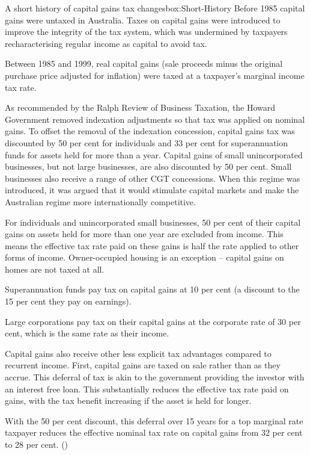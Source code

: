 \documentclass{grattan}\usepackage[]{graphicx}\usepackage[]{color}
\begin{document}
\begin{smallbox}[!htb]{A short history of capital gains tax changes}{box:Short-History}
Before 1985 capital gains were untaxed in Australia. Taxes on capital gains were introduced to improve the integrity of the tax system, which was undermined by taxpayers recharacterising regular income as capital to avoid tax.   

Between 1985 and 1999, real capital gains (sale proceeds minus the original purchase price adjusted for inflation) were taxed at a taxpayer's marginal income tax rate. 

As recommended by the Ralph Review of Business Taxation, the Howard Government removed indexation adjustments so that tax was applied on nominal gains. To offset the removal of the indexation concession, capital gains tax was discounted by 50 per cent for individuals and 33 per cent for superannuation funds for assets held for more than a year. Capital gains of small unincorporated businesses, but not large businesses, are also discounted by 50 per cent. Small businesses also receive a range of other CGT concessions. When this regime was introduced, it was argued that it would stimulate capital markets and make the Australian regime more internationally competitive.
\end{smallbox}

For individuals and unincorporated small businesses, 50 per cent of their capital gains on assets held for more than one year are excluded from income. This means the effective tax rate paid on these gains is half the rate applied to other forms of income. Owner-occupied housing is an exception – capital gains on homes are not taxed at all. 

Superannuation funds pay tax on capital gains at 10 per cent (a discount to the 15 per cent they pay on earnings). 

Large corporations pay tax on their capital gains at the corporate rate of 30 per cent, which is the same rate as their income.

Capital gains also receive other less explicit tax advantages compared to recurrent income. First, capital gains are taxed on sale rather than as they accrue. This deferral of tax is akin to the government providing the investor with an interest free loan.  This substantially reduces the effective tax rate paid on gains, with the tax benefit increasing if the asset is held for longer.


With the 50 per cent discount, this deferral over 15 years for a top marginal rate taxpayer reduces the effective nominal tax rate on capital gains from 32 per cent to 28 per cent. ()
\end{document}
